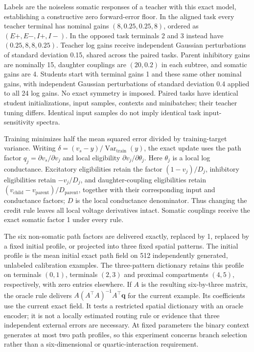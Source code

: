 Labels are the noiseless somatic responses of a teacher with this exact model, establishing a constructive zero forward-error floor. In the aligned task every teacher terminal has nominal gains $(8,0.25,0.25,8)$, ordered as $(E+,E-,I+,I-)$. In the opposed task terminals 2 and 3 instead have $(0.25,8,8,0.25)$. Teacher log gains receive independent Gaussian perturbations of standard deviation 0.15, shared across the paired tasks. Parent inhibitory gains are nominally 15, daughter couplings are $(20,0.2)$ in each subtree, and somatic gains are 4. Students start with terminal gains 1 and these same other nominal gains, with independent Gaussian perturbations of standard deviation 0.4 applied to all 24 log gains. No exact symmetry is imposed. Paired tasks have identical student initializations, input samples, contexts and minibatches; their teacher tuning differs. Identical input samples do not imply identical task input-sensitivity spectra.

Training minimizes half the mean squared error divided by training-target variance. Writing $\delta=(v_s-y)/\operatorname{Var}_{\mathrm{train}}(y)$, the exact update uses the path factor $q_j=\partial v_s/\partial v_j$ and local eligibility $\partial v_j/\partial\theta_j$. Here $\theta_j$ is a local log conductance. Excitatory eligibilities retain the factor $(1-v_j)/D_j$, inhibitory eligibilities retain $-v_j/D_j$, and daughter-coupling eligibilities retain $(v_{\mathrm{child}}-v_{\mathrm{parent}})/D_{\mathrm{parent}}$, together with their corresponding input and conductance factors; $D$ is the local conductance denominator. Thus changing the credit rule leaves all local voltage derivatives intact. Somatic couplings receive the exact somatic factor 1 under every rule.

The six non-somatic path factors are delivered exactly, replaced by 1, replaced by a fixed initial profile, or projected into three fixed spatial patterns. The initial profile is the mean initial exact path field on 512 independently generated, unlabeled calibration examples. The three-pattern dictionary retains this profile on terminals $(0,1)$, terminals $(2,3)$ and proximal compartments $(4,5)$, respectively, with zero entries elsewhere. If $A$ is the resulting six-by-three matrix, the oracle rule delivers $A(A^\top A)^{-1}A^\top\boldsymbol q$ for the current example. Its coefficients use the current exact field. It tests a restricted spatial dictionary with an oracle encoder; it is not a locally estimated routing rule or evidence that three independent external errors are necessary. At fixed parameters the binary context generates at most two path profiles, so this experiment concerns branch selection rather than a six-dimensional or quartic-interaction requirement.

